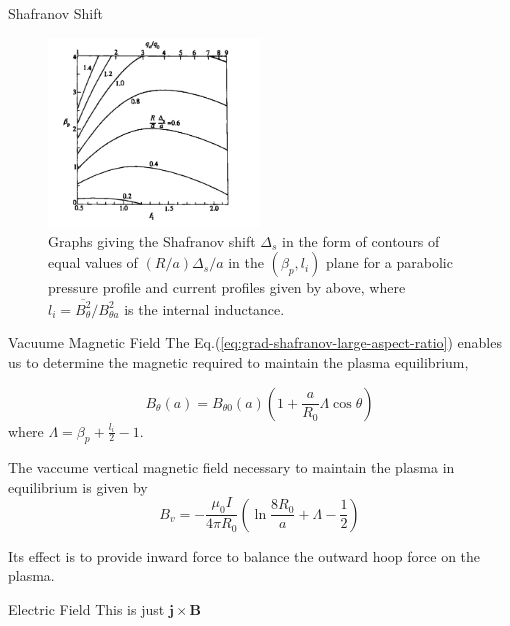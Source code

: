 \begin{frame} {Shafranov Shift}
  \begin{figure}
    \centering
    \includegraphics[width=0.5\textwidth]{figures/shafranov-shift.png}
    \caption{Graphs giving the Shafranov shift $\Delta_s$ in the form of contours of equal values of $(R/a)\Delta_s/a$ in the $(\beta_p,l_i)$ plane for a parabolic pressure profile and current profiles given by above, where $l_i=\overline{B_\theta^2}/B_{\theta a}^2$ is the internal inductance.}
    \label{fig:shafranov-shift}
  \end{figure}
\end{frame}

\begin{frame} {Vacuume Magnetic Field}
  The Eq.(\ref{eq:grad-shafranov-large-aspect-ratio}) enables us to determine the magnetic required to maintain the plasma equilibrium,

  \begin{equation}
    B_\theta(a) = B_{\theta0}(a)\left(1 + \frac{a}{R_0}\Lambda\cos\theta\right)
    \label{eq:poloidal-magnetic-field}
  \end{equation}
  where $\Lambda = \beta_p + \frac{l_i}{2} - 1$.

  The vaccume vertical magnetic field necessary to maintain the plasma in equilibrium is given by
  \[ B_v = -\frac{\mu_0I}{4\pi R_0}\left(\ln\frac{8R_0}{a}+ \Lambda - \frac{1}{2} \right) \]

  Its effect is to provide inward force to balance the outward hoop force on the plasma.
\end{frame}

\begin{frame} {Electric Field}
  This is just $\mathbf{j\times B}$
\end{frame}

